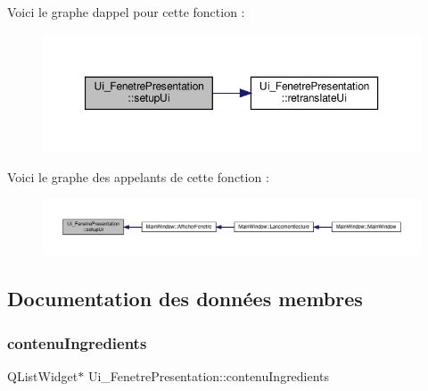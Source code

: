 Voici le graphe d\textquotesingle{}appel pour cette fonction \+:
\nopagebreak
\begin{figure}[H]
\begin{center}
\leavevmode
\includegraphics[width=350pt]{class_ui___fenetre_presentation_a08e799fcf97f8afe980e76770b4ef960_cgraph}
\end{center}
\end{figure}
Voici le graphe des appelants de cette fonction \+:
\nopagebreak
\begin{figure}[H]
\begin{center}
\leavevmode
\includegraphics[width=350pt]{class_ui___fenetre_presentation_a08e799fcf97f8afe980e76770b4ef960_icgraph}
\end{center}
\end{figure}


\subsection{Documentation des données membres}
\mbox{\label{class_ui___fenetre_presentation_a35b6dfdfa4899c487169582542e5b3e0}} 
\subsubsection{\texorpdfstring{contenu\+Ingredients}{contenuIngredients}}
{\footnotesize\ttfamily Q\+List\+Widget$\ast$ Ui\+\_\+\+Fenetre\+Presentation\+::contenu\+Ingredients}

\mbox{\label{class_ui___fenetre_presentation_a15b1c966591fea35f2769207cfa21a0e}} 
